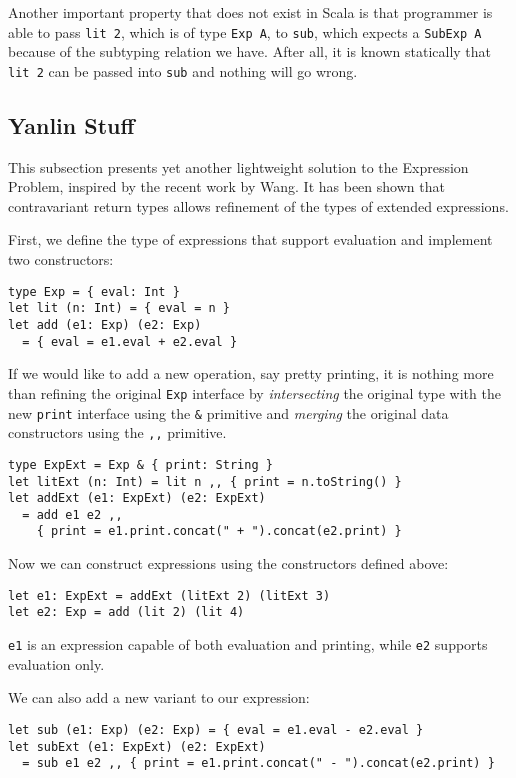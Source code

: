 Another important property that does not exist in Scala is that programmer is
able to pass \lstinline{lit 2}, which is of type \lstinline{Exp A}, to
\lstinline{sub}, which expects a \lstinline{SubExp A} because of the subtyping
relation we have. After all, it is known statically that \lstinline{lit 2} can
be passed into \lstinline{sub} and nothing will go wrong.

\subsection{Yanlin Stuff}

This subsection presents yet another lightweight solution to the Expression
Problem, inspired by the recent work by Wang. It has been shown that
contravariant return types allows refinement of the types of extended
expressions.

First, we define the type of expressions that support evaluation and implement
two constructors:
\begin{lstlisting}
type Exp = { eval: Int }
let lit (n: Int) = { eval = n }
let add (e1: Exp) (e2: Exp)
  = { eval = e1.eval + e2.eval }
\end{lstlisting}

If we would like to add a new operation, say pretty printing, it is nothing more
than refining the original \lstinline{Exp} interface by \emph{intersecting} the
original type with the new \lstinline{print} interface using the \lstinline{&}
primitive and \emph{merging} the original data constructors using the \lstinline{,,}
primitive.
\begin{lstlisting}
type ExpExt = Exp & { print: String }
let litExt (n: Int) = lit n ,, { print = n.toString() }
let addExt (e1: ExpExt) (e2: ExpExt)
  = add e1 e2 ,,
    { print = e1.print.concat(" + ").concat(e2.print) }
\end{lstlisting}

Now we can construct expressions using the constructors defined above:
\begin{lstlisting}
let e1: ExpExt = addExt (litExt 2) (litExt 3)
let e2: Exp = add (lit 2) (lit 4)
\end{lstlisting}
\lstinline{e1} is an expression capable of both evaluation and printing, while
\lstinline{e2} supports evaluation only.

We can also add a new variant to our expression:
\begin{lstlisting}
let sub (e1: Exp) (e2: Exp) = { eval = e1.eval - e2.eval }
let subExt (e1: ExpExt) (e2: ExpExt)
  = sub e1 e2 ,, { print = e1.print.concat(" - ").concat(e2.print) }
\end{lstlisting}


